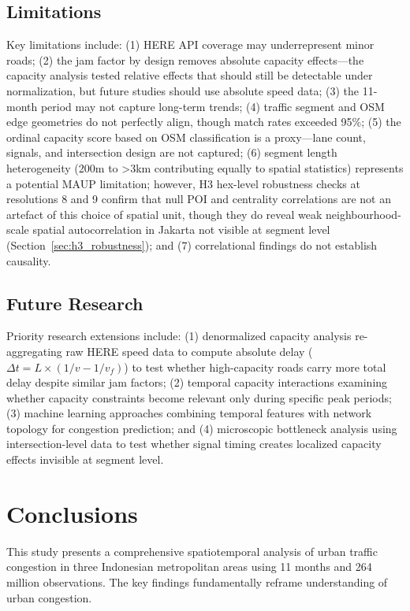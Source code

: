 \documentclass[12pt,a4paper]{article}
\begin{document}
\subsection{Limitations}

Key limitations include: (1) HERE API coverage may underrepresent minor roads; (2) the jam factor by design removes absolute capacity effects---the capacity analysis tested relative effects that should still be detectable under normalization, but future studies should use absolute speed data; (3) the 11-month period may not capture long-term trends; (4) traffic segment and OSM edge geometries do not perfectly align, though match rates exceeded 95\%; (5) the ordinal capacity score based on OSM classification is a proxy---lane count, signals, and intersection design are not captured; (6) segment length heterogeneity (200m to >3km contributing equally to spatial statistics) represents a potential MAUP limitation; however, H3 hex-level robustness checks at resolutions 8 and 9 confirm that null POI and centrality correlations are not an artefact of this choice of spatial unit, though they do reveal weak neighbourhood-scale spatial autocorrelation in Jakarta not visible at segment level (Section~\ref{sec:h3_robustness}); and (7) correlational findings do not establish causality.

\subsection{Future Research}

Priority research extensions include: (1) denormalized capacity analysis re-aggregating raw HERE speed data to compute absolute delay ($\Delta t = L \times (1/v - 1/v_f)$) to test whether high-capacity roads carry more total delay despite similar jam factors; (2) temporal capacity interactions examining whether capacity constraints become relevant only during specific peak periods; (3) machine learning approaches combining temporal features with network topology for congestion prediction; and (4) microscopic bottleneck analysis using intersection-level data to test whether signal timing creates localized capacity effects invisible at segment level.



\section{Conclusions}

This study presents a comprehensive spatiotemporal analysis of urban traffic congestion in three Indonesian metropolitan areas using 11 months and 264 million observations. The key findings fundamentally reframe understanding of urban congestion.
\end{document}
